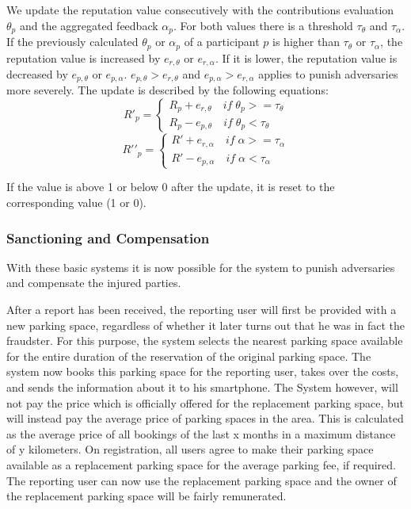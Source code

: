 \documentclass[
a4paper,     %
titlepage,   %
14pt         %
]{scrartcl}  %
\theoremstyle{mystyle}
\begin{document}
We update the reputation value consecutively with the contributions evaluation $\theta_p$  and the aggregated feedback $\alpha_p$. For both values there is a threshold $\tau_\theta$ and $\tau_\alpha$. If the previously calculated $\theta_p$ or $\alpha_p$ of a participant $p$ is higher than $\tau_\theta$ or $\tau_\alpha$, the reputation value is increased by $e_{r,\theta}$ or $e_{r,\alpha}$. If it is lower, the reputation value is decreased by $e_{p,\theta}$ or $e_{p,\alpha}$. $e_{p,\theta}>e_{r,\theta}$ and $e_{p,\alpha}>e_{r,\alpha}$ applies to punish adversaries more severely. The update is described by the following equations: 
\begin{equation}
  R\prime_p = \begin{cases} R_p + e_{r,\theta}\quad if\; \theta_p>=\tau_\theta \\ R_p - e_{p,\theta}\quad if\; \theta_p<\tau_\theta \end{cases}
\end{equation}
\begin{equation}
  R\prime\prime_p = \begin{cases} R\prime + e_{r,\alpha}\quad if\; \alpha>=\tau_\alpha \\ R\prime - e_{p,\alpha}\quad if\; \alpha<\tau_\alpha \end{cases}
\end{equation}

If the value is above 1 or below 0 after the update, it is reset to the corresponding value (1 or 0).

\subsubsection{Sanctioning and Compensation} With these basic systems it is now possible for the system to punish adversaries and compensate the injured parties. 

After a report has been received, the reporting user will first be provided with a new parking space, regardless of whether it later turns out that he was in fact the fraudster. For this purpose, the system selects the nearest parking space available for the entire duration of the reservation of the original parking space. The system now books this parking space for the reporting user, takes over the costs, and sends the information about it to his smartphone. The System however, will not pay the price which is officially offered for the replacement parking space, but will instead pay the average price of parking spaces in the area. This is calculated as the average price of all bookings of the last x months in a maximum distance of y kilometers. On registration, all users agree to make their parking space available as a replacement parking space for the average parking fee, if required. The reporting user can now use the replacement parking space and the owner of the replacement parking space will be fairly remunerated.
\end{document}
